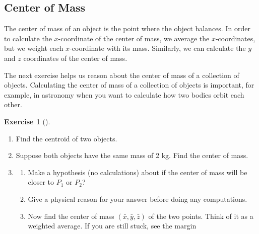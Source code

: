 \documentclass[10pt,]{book}
\theoremstyle{plain}
\theoremstyle{definition}
\theoremstyle{definition}
\theoremstyle{definition}
\theoremstyle{definition}
\newtheorem{exploration}[project]{Exercise}
\theoremstyle{definition}
\numberwithin{equation}{section}
\begin{document}
\subsection[{Center of Mass}]{Center of Mass}\label{subsection-31}
The center of mass of an object is the point where the object balances. In order to calculate the \(x\)-coordinate of the center of mass, we average the \(x\)-coordinates, but we weight each \(x\)-coordinate with its mass. Similarly, we can calculate the \(y\) and \(z\) coordinates of the center of mass.%
\par
The next exercise helps us reason about the center of mass of a collection of objects. Calculating the center of mass of a collection of objects is important, for example, in astronomy when you want to calculate how two bodies orbit each other.%
\begin{exploration}[]\label{center_of_mass_with_two_points}
\leavevmode%
\begin{enumerate}[font=\bfseries,label=(\alph*),ref=\alph*]
\item\label{task-564} Find the centroid of two objects.%
\item\label{task-565} Suppose both objects have the same mass of 2 kg.  Find the center of mass.%
\item\label{task-566} \begin{enumerate}[font=\bfseries,label=(\roman*),ref=\theenumi.\roman*]
\item\label{task-567} Make a hypothesis (no calculations) about if the center of mass will be closer to \(P_1\) or \(P_2\)?%
\item\label{task-568} Give a physical reason for your answer before doing any computations.%
\item\label{task-569} Now find the center of mass \((\bar x, \bar y, \bar z)\) of the two points. Think of it as a weighted average. If you are still stuck, see the margin%
\end{enumerate}
\end{enumerate}
\end{exploration}
\end{document}
